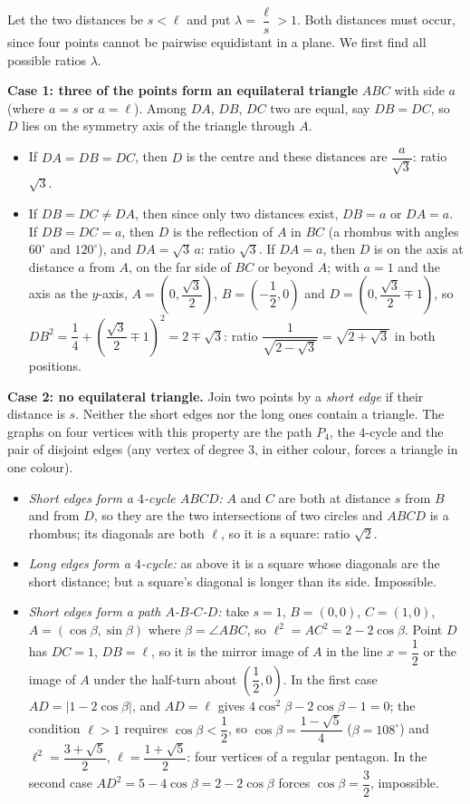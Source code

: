 Let the two distances be $s<\ell$ and put $\lambda=\dfrac{\ell}{s}>1$. Both distances must occur, since four points cannot be pairwise equidistant in a plane. We first find all possible ratios $\lambda$.

\textbf{Case 1: three of the points form an equilateral triangle} $ABC$ with side $a$ (where $a=s$ or $a=\ell$). Among $DA$, $DB$, $DC$ two are equal, say $DB=DC$, so $D$ lies on the symmetry axis of the triangle through $A$.
\begin{itemize}
\item If $DA=DB=DC$, then $D$ is the centre and these distances are $\dfrac{a}{\sqrt3}$: ratio $\sqrt3$.
\item If $DB=DC\ne DA$, then since only two distances exist, $DB=a$ or $DA=a$. If $DB=DC=a$, then $D$ is the reflection of $A$ in $BC$ (a rhombus with angles $60^\circ$ and $120^\circ$), and $DA=\sqrt3\,a$: ratio $\sqrt3$. If $DA=a$, then $D$ is on the axis at distance $a$ from $A$, on the far side of $BC$ or beyond $A$; with $a=1$ and the axis as the $y$-axis, $A=\left(0,\dfrac{\sqrt3}{2}\right)$, $B=\left(-\dfrac{1}{2},0\right)$ and $D=\left(0,\dfrac{\sqrt3}{2}\mp1\right)$, so $DB^2=\dfrac{1}{4}+\left(\dfrac{\sqrt3}{2}\mp1\right)^2=2\mp\sqrt3$: ratio $\dfrac{1}{\sqrt{2-\sqrt3}}=\sqrt{2+\sqrt3}$ in both positions.
\end{itemize}

\textbf{Case 2: no equilateral triangle.} Join two points by a \emph{short edge} if their distance is $s$. Neither the short edges nor the long ones contain a triangle. The graphs on four vertices with this property are the path $P_4$, the $4$-cycle and the pair of disjoint edges (any vertex of degree $3$, in either colour, forces a triangle in one colour).
\begin{itemize}
\item \emph{Short edges form a $4$-cycle $ABCD$:} $A$ and $C$ are both at distance $s$ from $B$ and from $D$, so they are the two intersections of two circles and $ABCD$ is a rhombus; its diagonals are both $\ell$, so it is a square: ratio $\sqrt2$.
\item \emph{Long edges form a $4$-cycle:} as above it is a square whose diagonals are the short distance; but a square's diagonal is longer than its side. Impossible.
\item \emph{Short edges form a path $A$-$B$-$C$-$D$:} take $s=1$, $B=(0,0)$, $C=(1,0)$, $A=(\cos\beta,\sin\beta)$ where $\beta=\angle ABC$, so $\ell^2=AC^2=2-2\cos\beta$. Point $D$ has $DC=1$, $DB=\ell$, so it is the mirror image of $A$ in the line $x=\dfrac{1}{2}$ or the image of $A$ under the half-turn about $\left(\dfrac{1}{2},0\right)$. In the first case $AD=|1-2\cos\beta|$, and $AD=\ell$ gives $4\cos^2\beta-2\cos\beta-1=0$; the condition $\ell>1$ requires $\cos\beta<\dfrac{1}{2}$, so $\cos\beta=\dfrac{1-\sqrt5}{4}$ ($\beta=108^\circ$) and $\ell^2=\dfrac{3+\sqrt5}{2}$, $\ell=\dfrac{1+\sqrt5}{2}$: four vertices of a regular pentagon. In the second case $AD^2=5-4\cos\beta=2-2\cos\beta$ forces $\cos\beta=\dfrac{3}{2}$, impossible.
\end{itemize}

